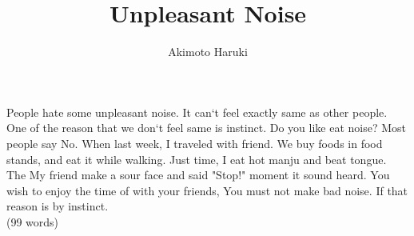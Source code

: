 \documentclass{article}
\title{Unpleasant Noise}
\author{Akimoto Haruki}
\begin{document}
\maketitle
  People hate some unpleasant noise. It can`t feel exactly same as other people. One of the reason that we don`t feel same is instinct. Do you like eat noise? Most people say No. When last week, I traveled with friend. We buy foods in food stands, and eat it while walking. Just time, I eat hot manju and beat tongue. The My friend make a sour face and said "Stop!" moment it sound heard. You wish to enjoy the time of with your friends, You must not make bad noise. If that reason is by instinct.
  \\(99 words)
\end{document}
